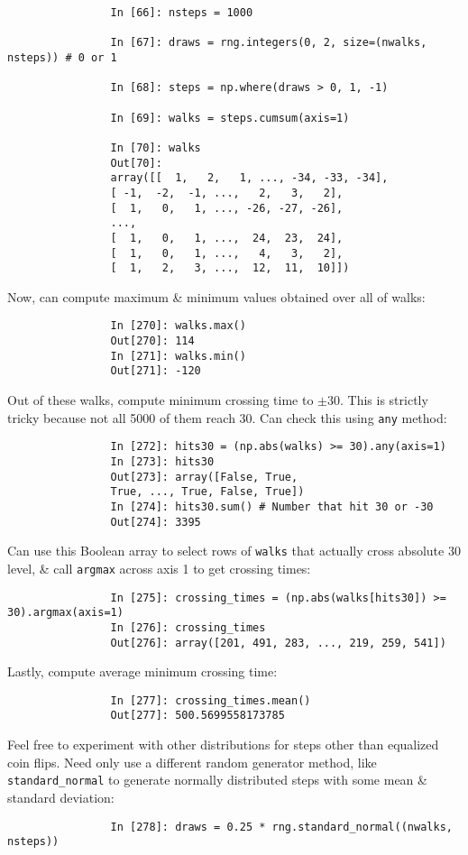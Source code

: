 \documentclass{article}
\begin{document}
\begin{itemize}
\begin{itemize}
\begin{itemize}
\begin{verbatim}
				In [66]: nsteps = 1000
				
				In [67]: draws = rng.integers(0, 2, size=(nwalks, nsteps)) # 0 or 1
				
				In [68]: steps = np.where(draws > 0, 1, -1)
				
				In [69]: walks = steps.cumsum(axis=1)
				
				In [70]: walks
				Out[70]: 
				array([[  1,   2,   1, ..., -34, -33, -34],
				[ -1,  -2,  -1, ...,   2,   3,   2],
				[  1,   0,   1, ..., -26, -27, -26],
				...,
				[  1,   0,   1, ...,  24,  23,  24],
				[  1,   0,   1, ...,   4,   3,   2],
				[  1,   2,   3, ...,  12,  11,  10]])	
			\end{verbatim}
			Now, can compute maximum \& minimum values obtained over all of walks:
			\begin{verbatim}
				In [270]: walks.max()
				Out[270]: 114
				In [271]: walks.min()
				Out[271]: -120
			\end{verbatim}
			Out of these walks, compute minimum crossing time to $\pm30$. This is strictly tricky because not all 5000 of them reach 30. Can check this using {\tt any} method:
			\begin{verbatim}
				In [272]: hits30 = (np.abs(walks) >= 30).any(axis=1)
				In [273]: hits30
				Out[273]: array([False, True,
				True, ..., True, False, True])
				In [274]: hits30.sum() # Number that hit 30 or -30
				Out[274]: 3395
			\end{verbatim}
			Can use this Boolean array to select rows of {\tt walks} that actually cross absolute 30 level, \& call {\tt argmax} across axis 1 to get crossing times:
			\begin{verbatim}
				In [275]: crossing_times = (np.abs(walks[hits30]) >= 30).argmax(axis=1)
				In [276]: crossing_times
				Out[276]: array([201, 491, 283, ..., 219, 259, 541])
			\end{verbatim}
			Lastly, compute average minimum crossing time:
			\begin{verbatim}
				In [277]: crossing_times.mean()
				Out[277]: 500.5699558173785
			\end{verbatim}
			Feel free to experiment with other distributions for steps other than equalized coin flips. Need only use a different random generator method, like \verb|standard_normal| to generate normally distributed steps with some mean \& standard deviation:
			\begin{verbatim}
				In [278]: draws = 0.25 * rng.standard_normal((nwalks, nsteps))
			\end{verbatim}
			

\end{itemize}
\end{itemize}
\end{itemize}
\end{document}
